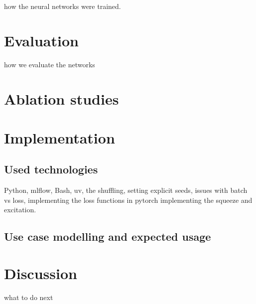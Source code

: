 \documentclass[
  digital,     %
  oneside,     %
  nosansbold,  %
  nocolorbold, %
  lof,         %
  lot,         %
]{fithesis4}
\begin{document}

how the neural networks were trained.

\chapter{Evaluation}
how we evaluate the networks

\chapter{Ablation studies}

\chapter{Implementation}

\section{Used technologies}
Python, mlflow, Bash, uv, the shuffling, setting explicit seeds, issues with
batch vs loss, implementing the loss functions in pytorch
implementing the squeeze and excitation.

\section{Use case modelling and expected usage}

\chapter{Discussion}
what to do next
\end{document}
